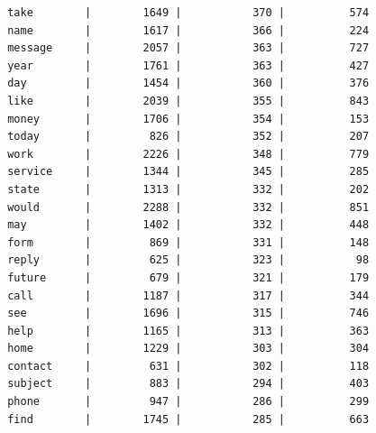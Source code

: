 \documentclass[a4paper,12pt]{article}
\begin{document}
\begin{verbatim}
 take        |        1649 |           370 |          574
 name        |        1617 |           366 |          224
 message     |        2057 |           363 |          727
 year        |        1761 |           363 |          427
 day         |        1454 |           360 |          376
 like        |        2039 |           355 |          843
 money       |        1706 |           354 |          153
 today       |         826 |           352 |          207
 work        |        2226 |           348 |          779
 service     |        1344 |           345 |          285
 state       |        1313 |           332 |          202
 would       |        2288 |           332 |          851
 may         |        1402 |           332 |          448
 form        |         869 |           331 |          148
 reply       |         625 |           323 |           98
 future      |         679 |           321 |          179
 call        |        1187 |           317 |          344
 see         |        1696 |           315 |          746
 help        |        1165 |           313 |          363
 home        |        1229 |           303 |          304
 contact     |         631 |           302 |          118
 subject     |         883 |           294 |          403
 phone       |         947 |           286 |          299
 find        |        1745 |           285 |          663
	\end{verbatim}
\end{document}
